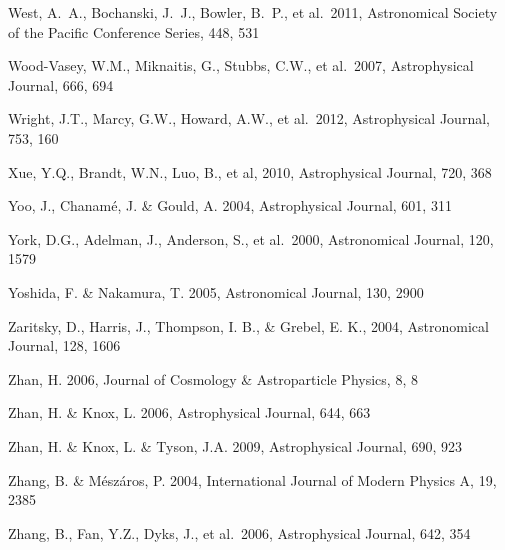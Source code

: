 \documentclass{emulateapj}
\begin{document}
\begin{thebibliography}{}
\bibitem[()]{} West, A.~A., Bochanski, J.~J., Bowler, B.~P., et al.~2011, Astronomical Society of the Pacific 
                  Conference Series, 448, 531

\bibitem[()]{} Wood-Vasey, W.M., Miknaitis, G., Stubbs, C.W., et al.~2007, Astrophysical Journal, 666, 694 

\bibitem[()]{} Wright, J.T., Marcy, G.W., Howard, A.W., et al.~2012, Astrophysical Journal, 753, 160

\bibitem[()]{} Xue, Y.Q., Brandt, W.N., Luo, B., et al, 2010,  Astrophysical Journal, 720, 368

\bibitem[()]{} Yoo, J., Chanam\'{e}, J. \& Gould, A. 2004, Astrophysical Journal, 601, 311

\bibitem[()]{} York, D.G., Adelman, J., Anderson, S., et al.~2000, Astronomical Journal, 120, 1579 

\bibitem[()]{} Yoshida, F. \& Nakamura, T. 2005, Astronomical Journal, 130, 2900 

\bibitem[()]{} Zaritsky, D., Harris, J., Thompson, I. B., \& Grebel, E. K., 2004, Astronomical Journal, 128, 1606

\bibitem[()]{} Zhan, H. 2006, Journal of Cosmology \& Astroparticle Physics, 8, 8

\bibitem[()]{} Zhan, H. \& Knox, L. 2006,  Astrophysical Journal, 644, 663

\bibitem[()]{} Zhan, H. \& Knox, L. \& Tyson, J.A. 2009,  Astrophysical Journal, 690, 923
	
\bibitem[()]{} Zhang, B. \& M\'{e}sz\'{a}ros, P. 2004, International Journal of Modern Physics A, 19, 2385

\bibitem[()]{} Zhang, B., Fan, Y.Z., Dyks, J., et al.~2006,  Astrophysical Journal, 642, 354

\end{thebibliography}
\end{document}
